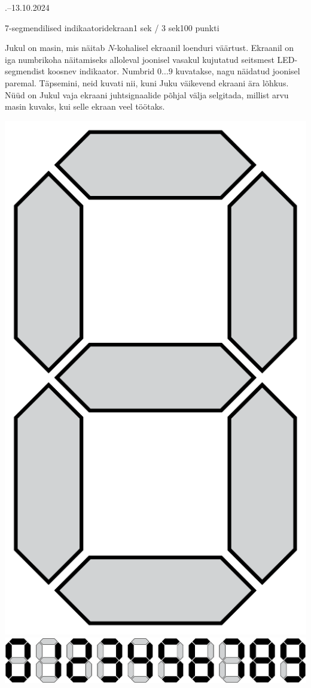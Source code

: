 \documentclass[a4paper,11pt]{article}
\begin{document}
\begin{ol}{\eio}{.--13.10.2024}{\yle}{}
\begin{yl}{6}{7-segmendilised indikaatorid}{ekraan}{1 sek / 3 sek}{100 punkti}

Jukul on masin, mis näitab $N$-kohalisel ekraanil loenduri väärtust. Ekraanil on iga numbrikoha näitamiseks alloleval joonisel vasakul kujutatud seitsmest LED-segmendist koosnev indikaator. Numbrid $0 \ldots 9$ kuvatakse, nagu näidatud joonisel paremal. Täpsemini, neid kuvati nii, kuni Juku väikevend ekraani ära lõhkus. Nüüd on Jukul vaja ekraani juhtsignaalide põhjal välja selgitada, millist arvu masin kuvaks, kui selle ekraan veel töötaks.

\begin{center}
	\includegraphics[scale=0.1]{joon1.pdf}
	\hspace{2cm}
	\includegraphics[scale=0.1]{joon2.pdf}
\end{center}


\end{yl}
\end{ol}
\end{document}
